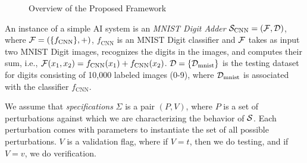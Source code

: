 \begin{figure}[h]
  \centering
  \caption{Overview of the Proposed Framework}
  \label{fig:framework}
\end{figure}

\begin{example}
  \label{ex:mnist-adder}
  An instance of a simple AI system is an \emph{MNIST Digit Adder} $\S_{\text{CNN}} = (\F,\D)$, where $\F = (\{f_{\text{CNN}}\}, +)$, $f_{\text{CNN}}$ is an MNIST Digit classifier and $\F$ takes as input two MNIST Digit images, recognizes the digits in the images, and computes their sum, i.e., $\F(x_1,x_2) = f_{\text{CNN}}(x_1) + f_{\text{CNN}}(x_2)$. $\D = \{ \D_{\text{mnist}} \}$ is the testing dataset for digits consisting of 10,000 labeled images (0-9), where $\D_{\text{mnist}}$ is associated with the classifier $f_{\text{CNN}}$.
  \end{example}
  
  We assume that \emph{specifications} $\Sigma$ is a pair $(P, V)$, where $P$ is a set of perturbations against which we are characterizing the behavior of $\S$. Each perturbation comes with parameters to instantiate the set of all possible perturbations. $V$ is a validation flag, where if $V=t$, then we do testing, and if $V=v$, we do verification.
  
